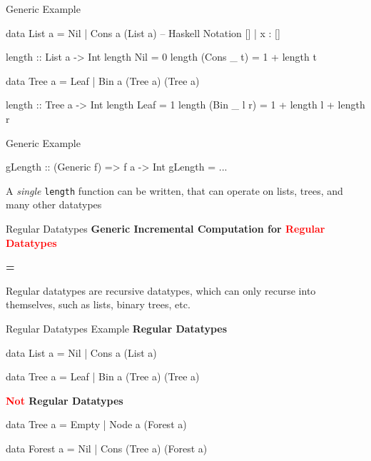 \begin{slide}{Generic Example}
\begin{haskell}
data List a = Nil | Cons a (List a) -- Haskell Notation [] | x : [] 

length :: List a -> Int
length Nil        = 0
length (Cons _ t) = 1 + length t

data Tree a = Leaf | Bin a (Tree a) (Tree a)

length :: Tree a -> Int
length Leaf        = 1
length (Bin _ l r) = 1 + length l + length r
\end{haskell}
\end{slide}

\begin{slide}{Generic Example}
\begin{chaskell}
gLength :: (Generic f) => f a -> Int
gLength = ...
\end{chaskell}

A \textit{single} \texttt{length} function can be written, that can operate on lists, trees, and many other datatypes
\end{slide}


\begin{slide}{Regular Datatypes}
\centering
\large \textbf{Generic Incremental Computation for \textcolor{red}{Regular Datatypes}}

\vspace*{.5cm}
\textbf{=}
\vspace*{.5cm}

Regular datatypes are recursive datatypes, which can only recurse into themselves, such as lists, binary trees, etc. 

\end{slide}


\begin{slide}{Regular Datatypes Example}
\textbf{Regular Datatypes}

\begin{haskell}
data List a = Nil | Cons a (List a)

data Tree a = Leaf | Bin a (Tree a) (Tree a)
\end{haskell}

\vspace*{0.5cm}
\textbf{\textcolor{red}{Not} Regular Datatypes}

\begin{haskell}
data Tree a = Empty | Node a (Forest a)

data Forest a = Nil | Cons (Tree a) (Forest a)
\end{haskell}
\end{slide}